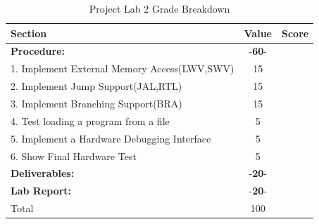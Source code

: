 \documentclass{article}
\begin{document}
\begin{table}[!htb]
  \begin{center}
    \begin{tabular}[width=0.9\textwidth]{|l|c|l|}
       \hline
       Section & Value & Score\\
       \hline 
       \multicolumn{1}{|l}{\textbf{Procedure:}}  & -\textbf{60}- &\\
       \hline
       1. Implement External Memory Access(LWV,SWV) & 15 &\\
       \hline
       2. Implement Jump Support(JAL,RTL) & 15 &\\
       \hline
       3. Implement Branching Support(BRA) & 15 &\\
       \hline
       4. Test loading a program from a file & 5 &\\
       \hline
       5. Implement a Hardware Debugging Interface & 5 &\\
       \hline
       6. Show Final Hardware Test & 5 &\\
       \hline
       \multicolumn{1}{|l}{\textbf{Deliverables:}}  & -\textbf{20}- &\\
       \hline
       \multicolumn{1}{|l}{\textbf{Lab Report:}}  & -\textbf{20}- &\\
       \hline
       \hline
       \multicolumn{1}{|l}{Total} & \multicolumn{1}{c|}{100} &\\
       \hline
    \end{tabular}
  \end{center}
  \caption{Project Lab 2 Grade Breakdown}
\end{table}
\end{document}

